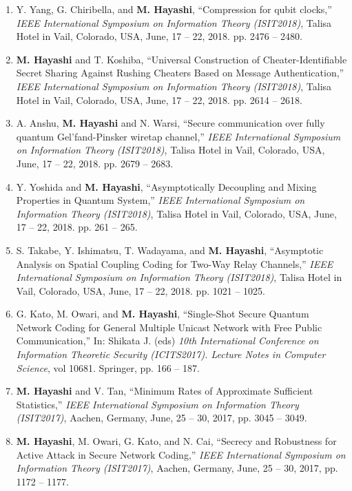 \documentclass[a4paper,12pt,oneside]{article}
\begin{document}
\begin{enumerate}
\item 
Y. Yang, G. Chiribella, and \textbf{M. Hayashi},
``Compression for qubit clocks,''
{\em IEEE International Symposium on Information Theory (ISIT2018)}, 
Talisa Hotel in Vail, Colorado, USA, June, 17 -- 22, 2018.
pp. 2476 -- 2480.

\item 
 \textbf{M. Hayashi} and T. Koshiba,
``Universal Construction of Cheater-Identifiable Secret Sharing Against Rushing Cheaters Based on Message Authentication,''
{\em IEEE International Symposium on Information Theory (ISIT2018)}, 
 Talisa Hotel in Vail, Colorado, USA, June, 17 -- 22, 2018.
pp. 2614 -- 2618.

\item 
A. Anshu, \textbf{M. Hayashi} and N. Warsi,
``Secure communication over fully quantum Gel'fand-Pinsker wiretap channel,''
{\em IEEE International Symposium on Information Theory (ISIT2018)}, 
 Talisa Hotel in Vail, Colorado, USA, June, 17 -- 22, 2018.
pp. 2679 -- 2683. 

\item 
Y. Yoshida and \textbf{M. Hayashi},
``Asymptotically Decoupling and Mixing Properties in Quantum System,''
{\em IEEE International Symposium on Information Theory (ISIT2018)}, 
 Talisa Hotel in Vail, Colorado, USA, June, 17 -- 22, 2018.
pp. 261 -- 265.
 
\item 
S. Takabe,
Y. Ishimatsu,
T. Wadayama, and \textbf{M. Hayashi},
``Asymptotic Analysis on Spatial Coupling Coding for Two-Way Relay Channels,''
{\em IEEE International Symposium on Information Theory (ISIT2018)}, 
 Talisa Hotel in Vail, Colorado, USA, June, 17 -- 22, 2018.
pp. 1021 -- 1025.


\item 
G. Kato, M. Owari, and \textbf{M. Hayashi},
``Single-Shot Secure Quantum Network Coding
for General Multiple Unicast Network with Free
Public Communication,''
In: Shikata J. (eds) 
{\em 10th International Conference on Information Theoretic Security (ICITS2017). 
Lecture Notes in Computer Science},
 vol 10681. Springer,  pp. 166 -- 187.

\item 
\textbf{M. Hayashi} and V. Tan,
``Minimum Rates of Approximate Sufficient Statistics,''
{\em IEEE International Symposium on Information Theory (ISIT2017)}, 
Aachen, Germany, June, 25 -- 30, 2017, pp. 3045 -- 3049.

\item 
\textbf{M. Hayashi}, M. Owari, G. Kato, and N. Cai,
``Secrecy and Robustness for Active Attack in Secure Network Coding,''
{\em IEEE International Symposium on Information Theory (ISIT2017)}, 
Aachen, Germany, June, 25 -- 30, 2017, pp. 1172 -- 1177.


\end{enumerate}
\end{document}
